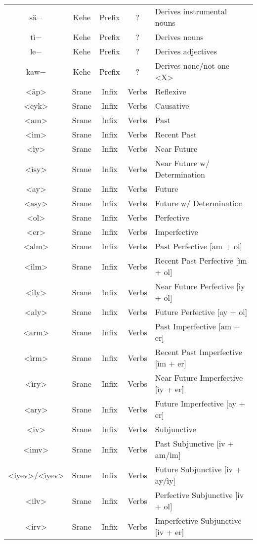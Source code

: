\begin{center}
\begin{longtable}[c]{|c c c c l|}
{sä$-$} & Kehe & Prefix & ? & Derives instrumental nouns\\
{tì$-$} & Kehe & Prefix & ? & Derives nouns\\
{le$-$} & Kehe & Prefix & ? & Derives adjectives\\
{kaw$-$} & Kehe & Prefix & ? & Derives none/not one <X>\\
{<äp>} & Srane & Infix & Verbs & Reflexive\\
{<eyk>} & Srane & Infix & Verbs & Causative\\
{<am>} & Srane & Infix & Verbs & Past\\
{<ìm>} & Srane & Infix & Verbs & Recent Past\\
{<ìy>} & Srane & Infix & Verbs & Near Future\\
{<ìsy>} & Srane & Infix & Verbs & Near Future w/ Determination\\
{<ay>} & Srane & Infix & Verbs & Future\\
{<asy>} & Srane & Infix & Verbs & Future w/ Determination\\
{<ol>} & Srane & Infix & Verbs & Perfective\\
{<er>} & Srane & Infix & Verbs & Imperfective\\
{<alm>} & Srane & Infix & Verbs & Past Perfective [am + ol]\\
{<ìlm>} & Srane & Infix & Verbs & Recent Past Perfective [ìm + ol]\\
{<ìly>} & Srane & Infix & Verbs & Near Future Perfective [ìy + ol]\\
{<aly>} & Srane & Infix & Verbs & Future Perfective [ay + ol]\\
{<arm>} & Srane & Infix & Verbs & Past Imperfective [am + er]\\
{<ìrm>} & Srane & Infix & Verbs & Recent Past Imperfective [ìm + er]\\
{<ìry>} & Srane & Infix & Verbs & Near Future Imperfective [ìy + er]\\
{<ary>} & Srane & Infix & Verbs & Future Imperfective [ay + er]\\
{<iv>} & Srane & Infix & Verbs & Subjunctive\\
{<imv>} & Srane & Infix & Verbs & Past Subjunctive [iv + am/ìm]\\
{<iyev>/<ìyev>} & Srane & Infix & Verbs & Future Subjunctive [iv + ay/ìy]\\
{<ilv>} & Srane & Infix & Verbs & Perfective Subjunctive [iv + ol]\\
{<irv>} & Srane & Infix & Verbs & Imperfective Subjunctive [iv + er]\\

\end{longtable}
\end{center}
